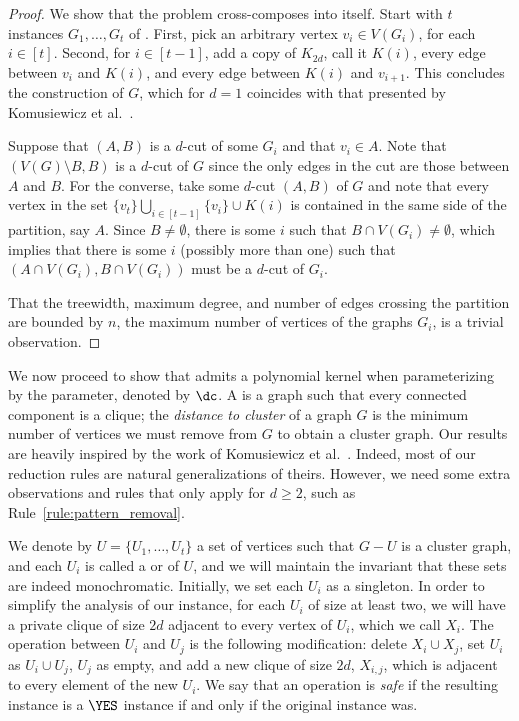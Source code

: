 \begin{proof}
    We show that the problem cross-composes into itself.
    Start with $t$ instances $G_1, \dots, G_t$ of .
    First, pick an arbitrary vertex $v_i \in V(G_i)$, for each $i \in [t]$.
    Second, for $i \in [t-1]$,  add a copy of $K_{2d}$, call it $K(i)$, every edge between $v_i$ and $K(i)$, and every edge between $K(i)$ and $v_{i+1}$.
    This concludes the construction of $G$, which  for $d=1$ coincides with that presented by Komusiewicz et al.~\cite{matching_cut_ipec}.

    Suppose that $(A, B)$ is a $d$-cut of some $G_i$ and that $v_i \in A$.
    Note that $(V(G) \setminus B, B)$ is a $d$-cut of $G$ since the only edges in the cut are those between $A$ and $B$.
    For the converse, take some $d$-cut $(A, B)$ of $G$ and note that every vertex in the set $\{v_t\} \bigcup_{i \in [t-1]}\{v_i\} \cup K(i)$ is contained in the same side of the partition, say $A$.
    Since $B \neq \emptyset$, there is some $i$ such that $B \cap V(G_i) \neq \emptyset$, which implies that there is some $i$ (possibly more than one) such that $(A \cap V(G_i), B \cap V(G_i))$ must be a $d$-cut of $G_i$.

    That the treewidth, maximum degree, and number of edges crossing the partition are bounded by $n$, the maximum number of vertices of the graphs $G_i$, is a trivial observation.
\end{proof}

We now proceed to show that  admits a polynomial kernel when parameterizing by the  parameter, denoted by $\dc$.
A  is a graph such that every connected component is a clique; the \emph{distance to cluster} of a graph $G$ is the minimum number of vertices we must remove from $G$ to obtain a cluster graph.
Our results are heavily inspired by the work of Komusiewicz et al.~\cite{matching_cut_ipec}.
Indeed, most of our reduction rules are natural generalizations of theirs. However, we need some extra observations and rules that only apply for $d \geq 2$, such as Rule~\ref{rule:pattern_removal}.



We denote by $U = \{U_1, \dots, U_t\}$ a set of vertices such that $G - U$ is a cluster graph, and each $U_i$ is called a  or  of $U$, and we will maintain the invariant that these sets are indeed monochromatic. Initially, we set each $U_i$ as a singleton.
In order to simplify the analysis of our instance, for each $U_i$ of size at least two, we will have a private clique of size $2d$ adjacent to every vertex of $U_i$, which we call $X_i$.
The  operation between $U_i$ and $U_j$ is the following modification: delete $X_i \cup X_j$, set $U_i$ as $U_i \cup U_j$, $U_j$ as empty, and add a new clique of size $2d$, $X_{i,j}$, which is adjacent to every element of the new $U_i$.
We say that an operation is \textit{safe} if the resulting instance  is a $\YES$ instance if and only if the original instance was.

